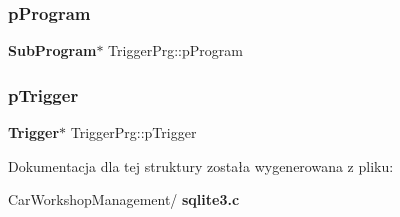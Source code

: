 \mbox{\label{struct_trigger_prg_aa770aee270c7c5df85578dc4a6686134}} 
\subsubsection{pProgram}
{\footnotesize\ttfamily \textbf{ Sub\+Program}$\ast$ Trigger\+Prg\+::p\+Program}

\mbox{\label{struct_trigger_prg_af70e5a74c954bc7a1eb8ee1162c40368}} 
\subsubsection{pTrigger}
{\footnotesize\ttfamily \textbf{ Trigger}$\ast$ Trigger\+Prg\+::p\+Trigger}



Dokumentacja dla tej struktury została wygenerowana z pliku\+:\begin{DoxyCompactItemize}
\item 
Car\+Workshop\+Management/\textbf{ sqlite3.\+c}\end{DoxyCompactItemize}
